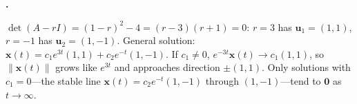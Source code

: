 \documentclass[10pt]{scrartcl}
\newcommand{\vv}[1]{\mathbf{#1}}
\begin{document}
\begin{prob}
  \textbf{.}\par{}
  \begin{steps}
    \ii $\det(A-rI)=(1-r)^2-4=(r-3)(r+1)=0$: $r=3$ has $\vv u_1=(1,1)$, $r=-1$ has $\vv u_2=(1,-1)$.
    \ii General solution: $\vv x(t)=c_1e^{3t}(1,1)+c_2e^{-t}(1,-1)$.
    \ii If $c_1\neq 0$, $e^{-3t}\vv x(t)\to c_1(1,1)$, so $\|\vv x(t)\|$ grows like $e^{3t}$ and approaches direction $\pm(1,1)$. Only solutions with $c_1=0$---the stable line $\vv x(t)=c_2e^{-t}(1,-1)$ through $(1,-1)$---tend to $\vv 0$ as $t\to\infty$.
  \end{steps}
\end{prob}
\end{document}
